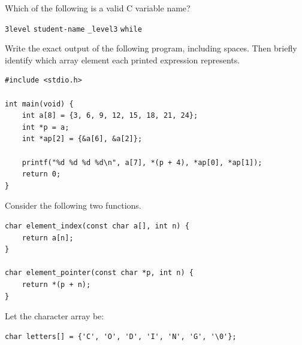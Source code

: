 \documentclass[12pt,a4paper,answers,addpoints]{exam}
\begin{document}
\begin{questions}
\question[2] Which of the following is a valid C variable name?
\begin{choices}
    \choice \texttt{3level}
    \choice \texttt{student-name}
    \choice \texttt{\_level3}
    \choice \texttt{while}
\end{choices}

\newpage
{}

\question[10] Write the exact output of the following program, including spaces.
Then briefly identify which array element each printed expression represents.
\begin{lstlisting}[style=examc]
#include <stdio.h>

int main(void) {
    int a[8] = {3, 6, 9, 12, 15, 18, 21, 24};
    int *p = a;
    int *ap[2] = {&a[6], &a[2]};

    printf("%d %d %d %d\n", a[7], *(p + 4), *ap[0], *ap[1]);
    return 0;
}
\end{lstlisting}
\shownoanswers{\vspace{4cm}}

\newpage
\question Consider the following two functions.
\begin{lstlisting}[style=examc]
char element_index(const char a[], int n) {
    return a[n];
}

char element_pointer(const char *p, int n) {
    return *(p + n);
}
\end{lstlisting}
Let the character array be:
\begin{lstlisting}[style=examc]
char letters[] = {'C', 'O', 'D', 'I', 'N', 'G', '\0'};
\end{lstlisting}
\end{questions}
\end{document}
